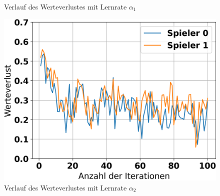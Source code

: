 \begin{figure}[H]
\begin{minipage}[c]{0.32\linewidth}
		\caption{Verlauf des Werteverlustes mit Lernrate $\alpha_1$}
	\end{minipage}
	\hfill
	\begin{minipage}[c]{0.32\linewidth}
		\includegraphics[width=\linewidth]{Bilder/ensemble-training/c_0_0001/graph_value_losses.png}
		\caption{Verlauf des Werteverlustes mit Lernrate $\alpha_2$}
	\end{minipage}
\end{figure}

